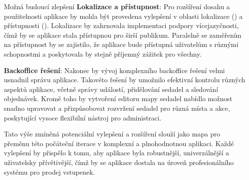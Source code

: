 \begin{section}{Možná budoucí zlepšení}
    \textbf{Lokalizace a přístupnost}: Pro rozšíření dosahu a použitelnosti aplikace by mohla být provedena vylepšení v oblasti lokalizace () a přístupnosti ().
    Lokalizace by zahrnovala implementaci podpory vícejazyčnosti, čímž by se aplikace stala přístupnou pro širší publikum.
    Paralelně se zaměřením na přístupnost by se zajistilo, že aplikace bude přístupná uživatelům s různými schopnostmi a poskytovala by stejně příjemný zážitek pro všechny.

    \textbf{Backoffice řešení}: Nakonec by vývoj komplexního backoffice řešení velmi usnadnil správu aplikace.
    Takovéto řešení by umožnilo efektivní kontrolu různých aspektů aplikace, včetně správy událostí, přidělování sedadel a sledování objednávek.
    Kromě toho by vytvoření editoru mapy sedadel nabídlo možnost snadno upravovat a přizpůsobovat rozvržení sedadel pro různá místa a akce, poskytující vysoce flexibilní nástroj pro administraci.

    Tato výše zmíněná potenciální vylepšení a rozšíření slouží jako mapa pro přeměnu této počáteční iterace v komplexní a plnohodnotnou aplikaci.
    Každé vylepšení by přispělo k tomu, aby aplikace byla robustnější, univerzálnější a uživatelsky přívětivější, čímž by se aplikace dostala na úroveň profesionálního systému pro prodej vstupenek.
\end{section}

